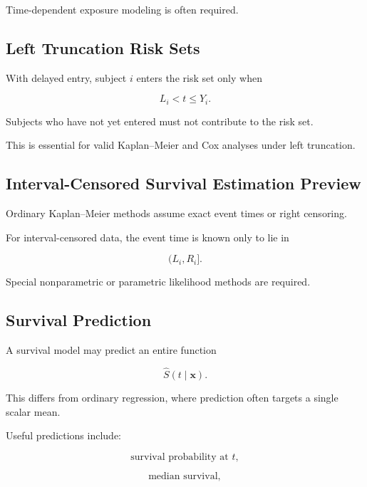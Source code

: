Time-dependent exposure modeling is often required.

\subsection{Left Truncation Risk Sets}
\label{subsec:left-truncation-risk-sets}

With delayed entry, subject \(i\) enters the risk set only when

\[
\boxed{
L_i<t\leq Y_i.
}
\]

Subjects who have not yet entered must not contribute to the risk set.

This is essential for valid Kaplan--Meier and Cox analyses under left
truncation.

\subsection{Interval-Censored Survival Estimation Preview}
\label{subsec:interval-censored-estimation}

Ordinary Kaplan--Meier methods assume exact event times or right
censoring.

For interval-censored data, the event time is known only to lie in

\[
(L_i,R_i].
\]

Special nonparametric or parametric likelihood methods are required.

\subsection{Survival Prediction}
\label{subsec:survival-prediction}

A survival model may predict an entire function

\[
\boxed{
\widehat{S}(t\mid\mathbf{x}).
}
\]

This differs from ordinary regression, where prediction often targets a
single scalar mean.

Useful predictions include:

\[
\boxed{
\text{survival probability at }t,
}
\]

\[
\boxed{
\text{median survival},
}
\]


